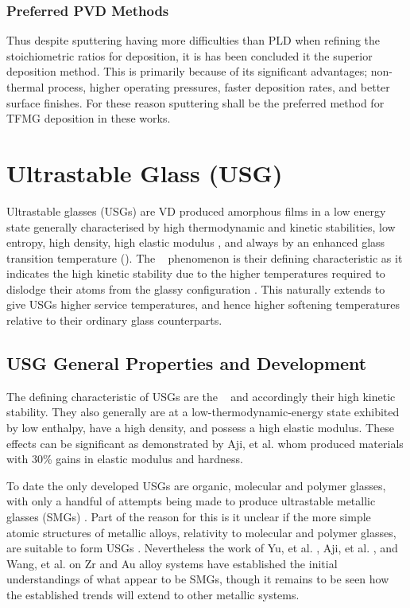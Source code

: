 \documentclass[draft,a4paper,12pt,oneside]{report}%
\begin{document}
\subsubsection{Preferred PVD Methods}
Thus despite sputtering having more difficulties than PLD when refining the stoichiometric ratios for deposition, it is has been concluded it the superior deposition method. This is primarily because of its significant advantages; non-thermal process, higher operating pressures, faster deposition rates, and better surface finishes. For these reason sputtering shall be the preferred method for TFMG deposition in these works. 

\section{Ultrastable Glass (USG)}
Ultrastable glasses (USGs) are VD produced amorphous films in a low energy state generally characterised by high thermodynamic and kinetic stabilities, low entropy, high density, high elastic modulus , and always by an enhanced glass transition temperature (\dTg). The \dTg~ phenomenon is their defining characteristic as it indicates the high kinetic stability due to the higher temperatures required to dislodge their atoms from the glassy configuration \cite{Swallen2007, Dawson2011}. This naturally extends to give USGs higher service temperatures, and hence higher softening temperatures relative to their ordinary glass counterparts.

\subsection{USG General Properties and Development}
The defining characteristic of USGs are the \dTg~ and accordingly their high kinetic stability. They also generally are at a low-thermodynamic-energy state exhibited by low enthalpy, have a high density, and possess a high elastic modulus. These effects can be significant as demonstrated by Aji, et al. \cite{Aji2013} whom produced materials with 30\% gains in elastic modulus and hardness.  

To date the only developed USGs are organic, molecular and polymer glasses, with only a handful of attempts being made to produce ultrastable metallic glasses (SMGs) \cite{Aji2013, Yu2013, Wang2014}. Part of the reason for this is it unclear if the more simple atomic structures of metallic alloys, relativity to molecular and polymer glasses, are suitable to form USGs \cite{Yu2013}. Nevertheless the work of Yu, et al. \cite{Yu2013}, Aji, et al. \cite{Aji2013}, and Wang, et al. \cite{Wang2014} on Zr and Au alloy systems have established the initial understandings of what appear to be SMGs, though it remains to be seen how the established trends will extend to other metallic systems. 
\end{document}
